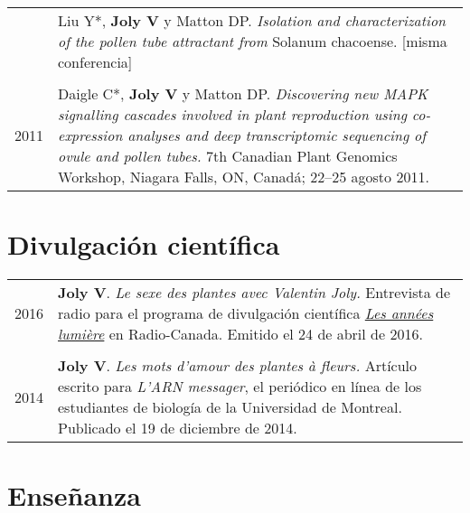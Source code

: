 \documentclass[letterpaper,12pt]{article}
\begin{document}
\begin{tabularx}{\textwidth}{@{}r|X@{}}
& Liu Y*, \textbf{Joly V} y Matton DP.
  \emph{Isolation and characterization of the pollen tube attractant from}
  Solanum chacoense. [misma conferencia]
  \\

\multicolumn{2}{c}{} \\

2011
& Daigle C*, \textbf{Joly V} y Matton DP.
  \emph{Discovering new MAPK signalling cascades involved in plant reproduction
  using co-expression analyses and deep transcriptomic sequencing of ovule
  and pollen tubes.}
  7th Canadian Plant Genomics Workshop, Niagara Falls, ON, Canadá;
  22–25 agosto 2011.
  \\

\end{tabularx}


\vspace{6mm}

\section[Divulgación científica]{Divulgación científica}

\begin{tabularx}{\textwidth}{@{}r|X@{}}

2016
& \textbf{Joly V}. {\em Le sexe des plantes avec Valentin Joly.} Entrevista de
  radio para el programa de divulgación científica
  \href{http://ici.radio-canada.ca/emissions/les_annees_lumiere/2009-2010/chronique.asp?idChronique=404672}{\emph{Les années lumière}}
  en Radio-Canada. Emitido el 24 de abril de 2016. \\

\multicolumn{2}{c}{} \\

2014
& \textbf{Joly V}. {\em Les mots d’amour des plantes à fleurs.} Artículo escrito
  para \emph{L'ARN messager}, el periódico en línea de los estudiantes de
  biología de la Universidad de Montreal. Publicado el 19 de diciembre de 2014.
  \\

\end{tabularx}


\newpage

\section{Enseñanza}
\end{document}
